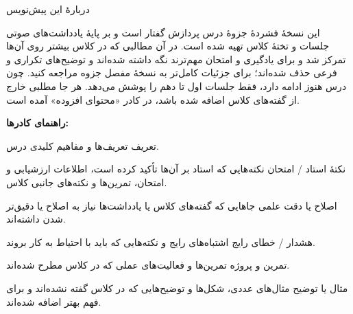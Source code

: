 \begingroup
\thispagestyle{empty}
{\titlefont\LARGE دربارهٔ این پیش‌نویس\par}
\vspace{1em}
این نسخهٔ فشردهٔ جزوهٔ درس پردازش گفتار است و بر پایهٔ یادداشت‌های صوتی جلسات و تختهٔ کلاس تهیه شده است. در آن مطالبی که در کلاس بیشتر روی آن‌ها تمرکز شد و برای یادگیری و امتحان مهم‌ترند نگه داشته شده‌اند و توضیح‌های تکراری و فرعی حذف شده‌اند؛ برای جزئیات کامل‌تر به نسخهٔ مفصل جزوه مراجعه کنید. چون درس هنوز ادامه دارد، فقط جلسات اول تا دهم را پوشش می‌دهد. هر جا مطلبی خارج از گفته‌های کلاس اضافه شده باشد، در کادر «محتوای افزوده» آمده است.

\vspace{0.6em}
\textbf{راهنمای کادرها:}

\begin{definitionbox}{تعریف}
تعریف‌ها و مفاهیم کلیدی درس.
\end{definitionbox}
\begin{exambox}{نکتهٔ استاد / امتحان}
نکته‌هایی که استاد بر آن‌ها تأکید کرده است، اطلاعات ارزشیابی و امتحان، تمرین‌ها و نکته‌های جانبی کلاس.
\end{exambox}
\begin{correctionbox}{اصلاح یا دقت علمی}
جاهایی که گفته‌های کلاس یا یادداشت‌ها نیاز به اصلاح یا دقیق‌تر شدن داشته‌اند.
\end{correctionbox}
\begin{warningbox}{هشدار / خطای رایج}
اشتباه‌های رایج و نکته‌هایی که باید با احتیاط به کار بروند.
\end{warningbox}
\begin{assignmentbox}{تمرین و پروژه}
تمرین‌ها و فعالیت‌های عملی که در کلاس مطرح شده‌اند.
\end{assignmentbox}
\begin{addedbox}{مثال یا توضیح}
مثال‌های عددی، شکل‌ها و توضیح‌هایی که در کلاس گفته نشده‌اند و برای فهم بهتر اضافه شده‌اند.
\end{addedbox}
\clearpage
\endgroup
